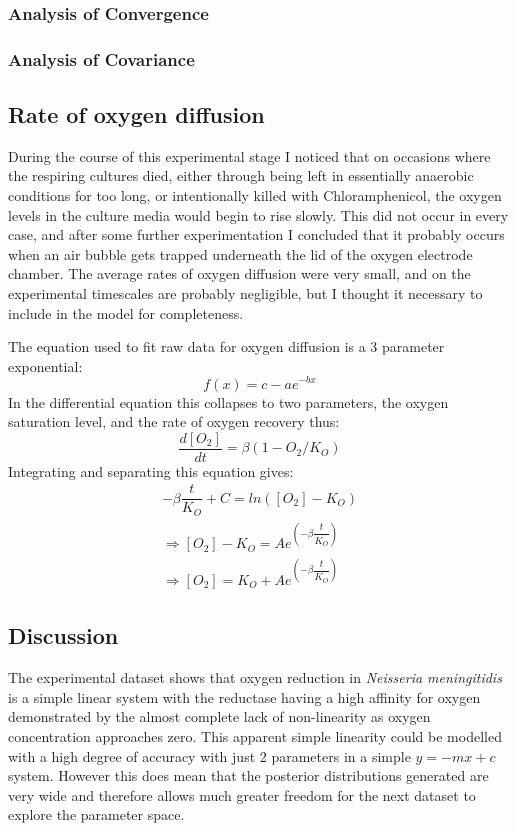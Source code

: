 \subsubsection{Analysis of Convergence}
\subsubsection{Analysis of Covariance}

\subsection{Rate of oxygen diffusion}
During the course of this experimental stage I noticed that on occasions where the respiring cultures died, either through being left in essentially anaerobic conditions for too long, or intentionally killed with Chloramphenicol, the oxygen levels in the culture media would begin to rise slowly. This did not occur in every case, and after some further experimentation I concluded that it probably occurs when an air bubble gets trapped underneath the lid of the oxygen electrode chamber. The average rates of oxygen diffusion were very small, and on the experimental timescales are probably negligible, but I thought it necessary to include in the model for completeness.

The equation used to fit raw data for oxygen diffusion is a 3 parameter exponential:
\begin{equation*}
f(x) = c - ae^{-bx} 
\end{equation*}
In the differential equation this collapses to two parameters, the oxygen saturation level, and the rate of oxygen recovery thus:
\begin{equation*}
\dfrac{d[O_2]}{dt} = \beta(1-O_2/K_O)
\end{equation*}
Integrating and separating this equation gives:
\begin{equation*}
\begin{gathered}
-\beta\dfrac{t}{K_O} + C = ln([O_2]-K_O)\\
\Rightarrow [O_2]-K_O = Ae^{\left(-\beta\dfrac{t}{K_O}\right)}\\
\Rightarrow [O_2] = K_O + Ae^{\left(-\beta\dfrac{t}{K_O}\right)}
\end{gathered}
\end{equation*}

\subsection{Discussion}
The experimental dataset shows that oxygen reduction in \textit{Neisseria meningitidis} is a simple linear system with the reductase having a high affinity for oxygen demonstrated by the almost complete lack of non-linearity as oxygen concentration approaches zero. This apparent simple linearity could be modelled with a high degree of accuracy with just 2 parameters in a simple $y=-mx+c$ system. However this does mean that the posterior distributions generated are very wide and therefore allows much greater freedom for the next dataset to explore the parameter space.

